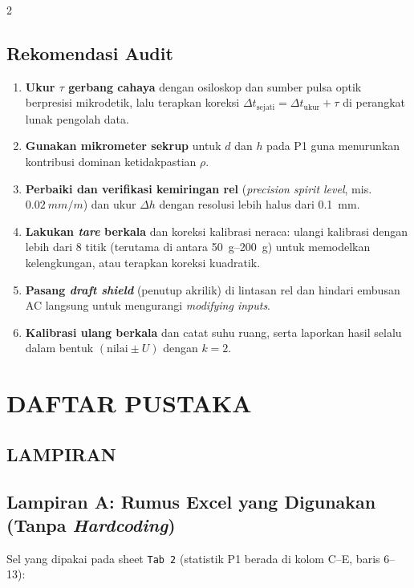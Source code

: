 \documentclass[a4paper, 12pt]{article}
\begin{document}
\begin{multicols}{2}
        \subsection{Rekomendasi Audit}
        \begin{enumerate}
            \item \textbf{Ukur $\tau$ gerbang cahaya} dengan osiloskop dan sumber pulsa optik berpresisi mikrodetik, lalu terapkan koreksi $\Delta t_{\mathrm{sejati}}=\Delta t_{\mathrm{ukur}}+\tau$ di perangkat lunak pengolah data.
            \item \textbf{Gunakan mikrometer sekrup} untuk $d$ dan $h$ pada P1 guna menurunkan kontribusi dominan ketidakpastian $\rho$.
            \item \textbf{Perbaiki dan verifikasi kemiringan rel} (\textit{precision spirit level}, mis. $\SI{0,02}{mm/m}$) dan ukur $\Delta h$ dengan resolusi lebih halus dari \SI{0,1}{mm}.
            \item \textbf{Lakukan \textit{tare} berkala} dan koreksi kalibrasi neraca: ulangi kalibrasi dengan lebih dari $8$ titik (terutama di antara \SIrange{50}{200}{g}) untuk memodelkan kelengkungan, atau terapkan koreksi kuadratik.
            \item \textbf{Pasang \textit{draft shield}} (penutup akrilik) di lintasan rel dan hindari embusan AC langsung untuk mengurangi \textit{modifying inputs}.
            \item \textbf{Kalibrasi ulang berkala} dan catat suhu ruang, serta laporkan hasil selalu dalam bentuk $(\text{nilai}\pm U)$ dengan $k=2$.
        \end{enumerate}

    \section{DAFTAR PUSTAKA}
    \printbibliography[heading=none]

\end{multicols}

\onecolumn
    \newpage
    \begin{center}
        \section{LAMPIRAN}
    \end{center}

    \appendix

    \subsection*{Lampiran A: Rumus Excel yang Digunakan (Tanpa \textit{Hardcoding})}
    \noindent Sel yang dipakai pada sheet \texttt{Tab 2} (statistik P1 berada di kolom C--E, baris 6--13):
\end{document}

